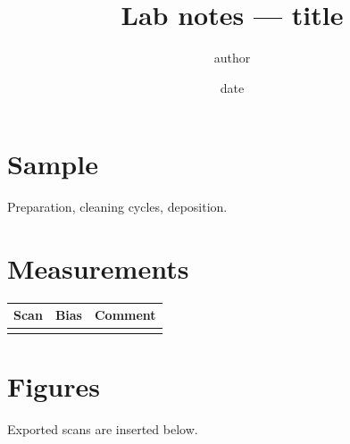 \documentclass[11pt,a4paper]{article}
\title{Lab notes — {{title}}}
\author{ {{author}} }
\date{ {{date}} }
\begin{document}
\maketitle

\section*{Sample}
Preparation, cleaning cycles, deposition.

\section*{Measurements}
\begin{tabular}{lll}
  \toprule
  Scan & Bias & Comment \\
  \midrule
   &  &  \\
  \bottomrule
\end{tabular}

\section*{Figures}
Exported scans are inserted below.
\end{document}
